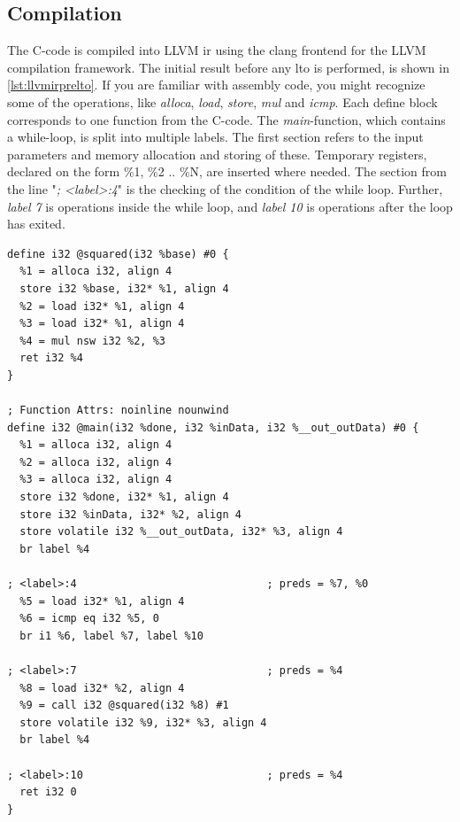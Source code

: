 \subsection{Compilation}
The C-code is compiled into LLVM \gls{ir} using the clang frontend for the LLVM compilation framework. The initial result before any \gls{lto} is performed, is shown in \cref{lst:llvmirprelto}. If you are familiar with assembly code, you might recognize some of the operations, like \textit{alloca}, \textit{load}, \textit{store}, \textit{mul} and \textit{icmp}. Each define block corresponds to one function from the C-code. The \textit{main}-function, which contains a while-loop, is split into multiple labels. The first section refers to the input parameters and memory allocation and storing of these. Temporary registers, declared on the form \%1, \%2 .. \%N, are inserted where needed. The section from the line "\textit{; <label>:4}" is the checking of the condition of the while loop. Further, \textit{label 7} is operations inside the while loop, and \textit{label 10} is operations after the loop has exited.
\lstset{language=llvm,style=LLVMstyle}
\begin{lstlisting}[caption={LLVM IR before LTO},label=lst:llvmirprelto]
define i32 @squared(i32 %base) #0 {
  %1 = alloca i32, align 4
  store i32 %base, i32* %1, align 4
  %2 = load i32* %1, align 4
  %3 = load i32* %1, align 4
  %4 = mul nsw i32 %2, %3
  ret i32 %4
}

; Function Attrs: noinline nounwind
define i32 @main(i32 %done, i32 %inData, i32 %__out_outData) #0 {
  %1 = alloca i32, align 4
  %2 = alloca i32, align 4
  %3 = alloca i32, align 4
  store i32 %done, i32* %1, align 4
  store i32 %inData, i32* %2, align 4
  store volatile i32 %__out_outData, i32* %3, align 4
  br label %4

; <label>:4                              ; preds = %7, %0
  %5 = load i32* %1, align 4
  %6 = icmp eq i32 %5, 0
  br i1 %6, label %7, label %10

; <label>:7                              ; preds = %4
  %8 = load i32* %2, align 4
  %9 = call i32 @squared(i32 %8) #1
  store volatile i32 %9, i32* %3, align 4
  br label %4

; <label>:10                             ; preds = %4
  ret i32 0
}
\end{lstlisting}
